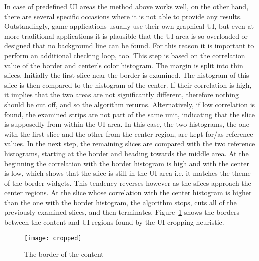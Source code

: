 \documentclass[draft,final]{vutinfth} %
\begin{document}
	In case of predefined UI areas the method above works well, on the other hand, there are several specific occasions where it is not able to provide any results.
	Outstandingly, game applications usually use their own graphical UI, but even at more traditional applications it is plausible that the UI area is so overloaded or designed that no background line can be found.
	For this reason it is important to perform an additional checking loop, too.
	This step is based on the correlation value of the border and center's color histogram.
	The margin is split into thin slices.
	Initially the first slice near the border is examined.
	The histogram of this slice is then compared to the histogram of the center.
	If their correlation is high, it implies that the two areas are not significantly different, therefore nothing should be cut off, and so the algorithm returns.
	Alternatively, if low correlation is found, the examined strips are not part of the same unit, indicating that the slice is supposedly from within the UI area.
	In this case, the two histograms, the one with the first slice and the other from the center region, are kept for/as reference values.
	In the next step, the remaining slices are compared with the two reference histograms, starting at the border and heading towards the middle area.
	At the beginning the correlation with the border histogram is high and with the center is low, which shows that the slice is still in the UI area i.e. it matches the theme of the border widgets.
	This tendency reverses however as the slices approach the center regions.
	At the slice whose correlation with the center histogram is higher than the one with the border histogram, the algorithm stops, cuts all of the previously examined slices, and then terminates.
	Figure~\ref{fig:cropped} shows the borders between the content and UI regions found by the UI cropping heuristic.\par 
	\begin{figure}[h]
		\centering		
		\texttt{[image: cropped]}
		\caption{The border of the content}
		\label{fig:cropped}
	\end{figure}
	
\end{document}
